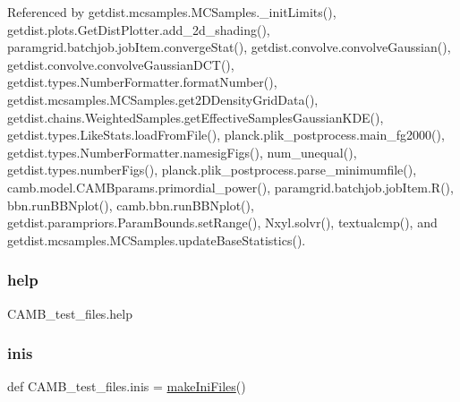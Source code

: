 Referenced by getdist.\+mcsamples.\+M\+C\+Samples.\+\_\+init\+Limits(), getdist.\+plots.\+Get\+Dist\+Plotter.\+add\+\_\+2d\+\_\+shading(), paramgrid.\+batchjob.\+job\+Item.\+converge\+Stat(), getdist.\+convolve.\+convolve\+Gaussian(), getdist.\+convolve.\+convolve\+Gaussian\+D\+C\+T(), getdist.\+types.\+Number\+Formatter.\+format\+Number(), getdist.\+mcsamples.\+M\+C\+Samples.\+get2\+D\+Density\+Grid\+Data(), getdist.\+chains.\+Weighted\+Samples.\+get\+Effective\+Samples\+Gaussian\+K\+D\+E(), getdist.\+types.\+Like\+Stats.\+load\+From\+File(), planck.\+plik\+\_\+postprocess.\+main\+\_\+fg2000(), getdist.\+types.\+Number\+Formatter.\+namesig\+Figs(), num\+\_\+unequal(), getdist.\+types.\+number\+Figs(), planck.\+plik\+\_\+postprocess.\+parse\+\_\+minimumfile(), camb.\+model.\+C\+A\+M\+Bparams.\+primordial\+\_\+power(), paramgrid.\+batchjob.\+job\+Item.\+R(), bbn.\+run\+B\+B\+Nplot(), camb.\+bbn.\+run\+B\+B\+Nplot(), getdist.\+parampriors.\+Param\+Bounds.\+set\+Range(), Nxyl.\+solvr(), textualcmp(), and getdist.\+mcsamples.\+M\+C\+Samples.\+update\+Base\+Statistics().

\mbox{\label{namespaceCAMB__test__files_a5e8a642e477196d509273a7c1ce53a47}} 
\subsubsection{\texorpdfstring{help}{help}}
{\footnotesize\ttfamily C\+A\+M\+B\+\_\+test\+\_\+files.\+help}

\mbox{\label{namespaceCAMB__test__files_adb63f5afc156ccfe8108790fdb1f5f49}} 
\subsubsection{\texorpdfstring{inis}{inis}}
{\footnotesize\ttfamily def C\+A\+M\+B\+\_\+test\+\_\+files.\+inis = \mbox{\hyperlink{namespaceCAMB__test__files_a2071b2434992a52dd7fc9c49db14d86d}{make\+Ini\+Files}}()}

\mbox{\label{namespaceCAMB__test__files_ae3f939a649209ec8d0004b0dfef3210b}} 
